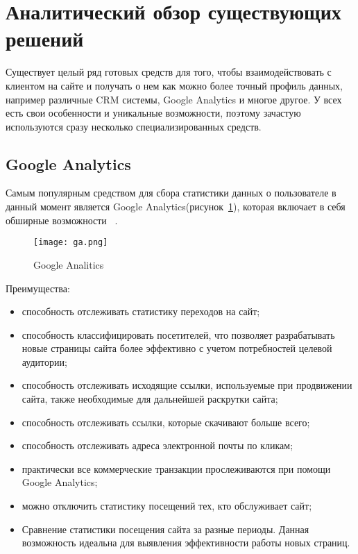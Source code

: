 \section{Аналитический обзор существующих решений}
\label{sec:alternatives:intro}

Существует целый ряд готовых средств для того, чтобы взаимодействовать с клиентом на сайте и получать о нем как можно более точный профиль данных, например различные CRM системы, Google Analytics и многое другое. У всех есть свои особенности и уникальные возможности, поэтому зачастую используются сразу несколько специализированных средств. 


\subsection{Google Analytics}
\label{sub:alternatives:ga}
Самым популярным средством для сбора статистики данных о пользователе в данный момент является Google Analytics(рисунок~\ref{fig:ga}), которая включает в себя обширные возможности ~\cite{ga}.

\begin{figure}[ht]
\centering
  \texttt{[image: ga.png]}  
  \caption{Google Analitics}
	\label{fig:ga}
\end{figure}


Преимущества:
\begin{itemize}
\item способность отслеживать статистику переходов на сайт;
\item способность классифицировать посетителей, что позволяет разрабатывать новые страницы сайта более эффективно с учетом потребностей целевой аудитории;
\item способность отслеживать исходящие ссылки, используемые при продвижении сайта, также необходимые для дальнейшей раскрутки сайта;
\item способность отслеживать ссылки, которые скачивают больше всего;
\item способность отслеживать адреса электронной почты по кликам;
\item практически все коммерческие транзакции прослеживаются при помощи Google Analytics;
\item можно отключить статистику посещений тех, кто обслуживает сайт;
\item Сравнение статистики посещения сайта за разные периоды. Данная возможность идеальна для выявления эффективности работы новых страниц.
\end{itemize}


